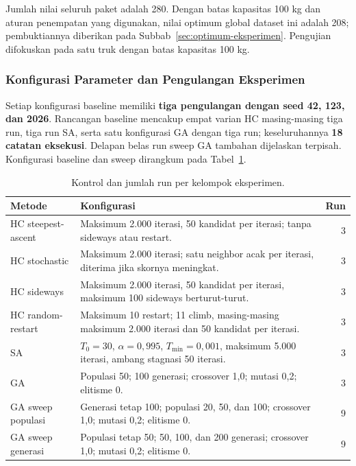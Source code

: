 \documentclass[12pt,a4paper]{article}
\begin{document}
Jumlah nilai seluruh paket adalah 280. Dengan batas kapasitas 100 kg dan aturan penempatan yang digunakan, nilai optimum global dataset ini adalah 208; pembuktiannya diberikan pada Subbab~\ref{sec:optimum-eksperimen}. Pengujian difokuskan pada satu truk dengan batas kapasitas 100 kg.

\subsubsection{Konfigurasi Parameter dan Pengulangan Eksperimen}
Setiap konfigurasi baseline memiliki \textbf{tiga pengulangan dengan seed 42, 123, dan 2026}. Rancangan baseline mencakup empat varian HC masing-masing tiga run, tiga run SA, serta satu konfigurasi GA dengan tiga run; keseluruhannya \textbf{18 catatan eksekusi}. Delapan belas run sweep GA tambahan dijelaskan terpisah. Konfigurasi baseline dan sweep dirangkum pada Tabel~\ref{tab:konfigurasi-eksperimen}.

\begin{table}[htbp]
    \centering
    \small
    \renewcommand{\arraystretch}{1.2}
    \begin{tabularx}{\textwidth}{@{}>{\raggedright\arraybackslash}p{3.3cm} X r@{}}
        \toprule
        Metode & Konfigurasi & Run \\
        \midrule
        HC steepest-ascent & Maksimum 2.000 iterasi, 50 kandidat per iterasi; tanpa sideways atau restart. & 3 \\
        HC stochastic & Maksimum 2.000 iterasi; satu neighbor acak per iterasi, diterima jika skornya meningkat. & 3 \\
        HC sideways & Maksimum 2.000 iterasi, 50 kandidat per iterasi, maksimum 100 sideways berturut-turut. & 3 \\
        HC random-restart & Maksimum 10 restart; 11 climb, masing-masing maksimum 2.000 iterasi dan 50 kandidat per iterasi. & 3 \\
        SA & $T_0=30$, $\alpha=0{,}995$, $T_{\min}=0{,}001$, maksimum 5.000 iterasi, ambang stagnasi 50 iterasi. & 3 \\
        GA & Populasi 50; 100 generasi; crossover 1,0; mutasi 0,2; elitisme 0. & 3 \\
        GA sweep populasi & Generasi tetap 100; populasi 20, 50, dan 100; crossover 1,0; mutasi 0,2; elitisme 0. & 9 \\
        GA sweep generasi & Populasi tetap 50; 50, 100, dan 200 generasi; crossover 1,0; mutasi 0,2; elitisme 0. & 9 \\
        \bottomrule
    \end{tabularx}
    \caption{Kontrol dan jumlah run per kelompok eksperimen.}
    \label{tab:konfigurasi-eksperimen}
\end{table}
\end{document}
